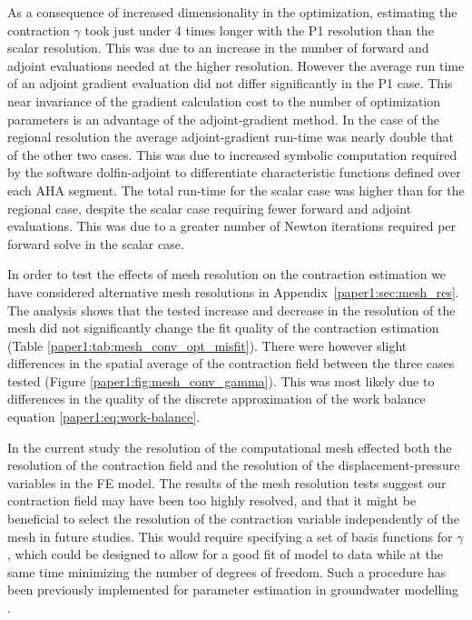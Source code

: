 As a consequence of increased dimensionality in the optimization, 
estimating the contraction $\gamma$ took just under
4 times longer with the P1 resolution than the scalar resolution.
This was due to an increase in the number of 
forward and adjoint evaluations needed at the higher resolution. 
However the average run time of an adjoint gradient evaluation
did not differ significantly in the P1 case.  This near invariance 
of the gradient calculation cost to the number of optimization 
parameters is an advantage of the adjoint-gradient
method. In the case of the regional resolution the average adjoint-gradient 
run-time was nearly double that of the other two cases.
This was due to increased symbolic computation required by the 
software dolfin-adjoint to differentiate characteristic
functions defined over each AHA segment. The total run-time for the 
scalar case was higher than for the regional case, despite the
scalar case requiring fewer forward and adjoint evaluations. This was due to 
a greater number of Newton iterations 
required per forward solve in the scalar case.

In order to test the effects of mesh resolution on the contraction estimation we have considered
alternative mesh resolutions in Appendix~\ref{paper1:sec:mesh_res}. The analysis shows that 
the tested increase and decrease
in the resolution of the mesh did not significantly change the 
fit quality of the contraction estimation (Table \ref{paper1:tab:mesh_conv_opt_misfit}).
There were however slight differences in the spatial average of the contraction field 
between the three cases tested
(Figure \ref{paper1:fig:mesh_conv_gamma}). This was most likely due to differences 
in the quality of the discrete approximation of 
the work balance equation \eqref{paper1:eq:work-balance}.


In the current study the 
resolution of the computational mesh effected both the resolution of the contraction 
field and the resolution of the displacement-pressure variables	 in the FE model.
The results of the mesh resolution tests suggest our contraction field may have
been too highly resolved, and that it might be beneficial
to select the resolution of the contraction variable independently of the mesh
in future studies. This would require specifying a set of basis functions for $\gamma$, 
which could be designed to allow for a good fit of model to data while
at the same time minimizing the number of degrees of freedom.
Such a procedure has been previously implemented for parameter 
estimation in groundwater modelling \cite{tsai2003global}.

